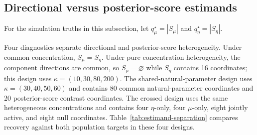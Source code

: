 \documentclass[preprint,12pt,authoryear]{elsarticle}
\begin{document}




\FloatBarrier
\subsection{Directional versus posterior-score estimands}
\label{sec:estimand-comparison}

For the simulation truths in this subsection, let
$q_\mu^\star=|S_\mu|$ and $q_\eta^\star=|S_\eta|$.

Four diagnostics separate directional and posterior-score heterogeneity. Under
common concentration, $S_\mu=S_\eta$. Under pure concentration
heterogeneity, the component directions are common, so $S_\mu=\varnothing$
while $S_\eta$ contains 16 coordinates; this design uses
$\kappa=(10,30,80,200)$. The shared-natural-parameter design uses
$\kappa=(30,40,50,60)$ and contains
80 common natural-parameter coordinates and 20 posterior-score contrast coordinates.
The crossed design uses the same heterogeneous concentrations and contains
four $\eta$-only, four $\mu$-only, eight jointly active, and eight null
coordinates. Table~\ref{tab:estimand-separation}
compares recovery against both population targets in these four designs.

\FloatBarrier
\begin{table}[H]
\centering
\small
\caption{Directional and posterior-score contrast recovery in the estimand-separation
designs. Entries are means over 100 replications, and the two target-specific
$F_1$ scores are evaluated against their respective population targets. The exact-support column uses $S_\mu$ for
M-CGL and $S_\eta$ for E-CGL.}
\label{tab:estimand-separation}
\end{table}
\end{document}
